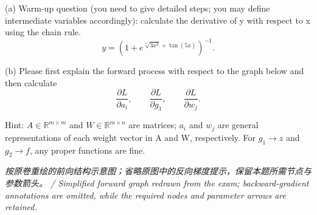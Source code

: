 (a) Warm-up question (you need to give detailed steps; you may define intermediate variables accordingly): calculate the derivative of y with respect to x using the chain rule.
\[
y=\left(1+e^{\sqrt[3]{3x^2}+\tan(5x)}\right)^{-1}.
\]


(b) Please first explain the forward process with respect to the graph below and then calculate
\[
\frac{\partial L}{\partial a_i},\qquad
\frac{\partial L}{\partial g_1},\qquad
\frac{\partial L}{\partial w_j}.
\]


Hint: \(A\in\mathbb R^{m\times m}\) and \(W\in\mathbb R^{m\times n}\) are matrices; \(a_i\) and \(w_j\) are general representations of each weight vector in A and W, respectively. For \(g_1\to z\) and \(g_2\to f\), any proper functions are fine.




\emph{按原卷重绘的前向结构示意图；省略原图中的反向梯度提示，保留本题所需节点与参数箭头。 / Simplified forward graph redrawn from the exam; backward-gradient annotations are omitted, while the required nodes and parameter arrows are retained.}
